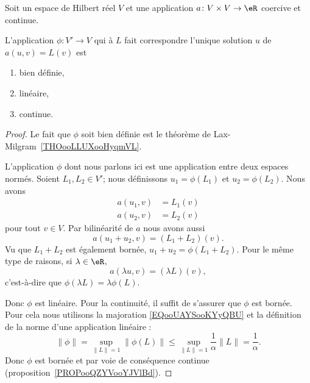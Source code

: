 \begin{proposition} \label{PROPooFEOZooTNPcBJ}
	Soit un espace de Hilbert réel \( V\) et une application \( a\colon V\times V\to \eR\) coercive et continue.

	L'application \( \phi\colon V'\to V\) qui à \( L\) fait correspondre l'unique solution \( u\) de \( a(u,v)=L(v)\) est
	\begin{enumerate}
		\item
		      bien définie,
		\item
		      linéaire,
		\item
		      continue.
	\end{enumerate}
\end{proposition}

\begin{proof}
	Le fait que \( \phi\) soit bien définie est le théorème de Lax-Milgram~\ref{THOooLLUXooHyqmVL}.

	L'application \( \phi\) dont nous parlons ici est une application entre deux espaces normés. Soient \( L_1,L_2\in V'\); nous définissons \( u_1=\phi(L_1)\) et \( u_2=\phi(L_2)\). Nous avons
	\begin{subequations}
		\begin{align}
			a(u_1,v) & =L_1(v) \\
			a(u_2,v) & =L_2(v)
		\end{align}
	\end{subequations}
	pour tout $v\in V$. Par bilinéarité de \( a\) nous avons aussi
	\begin{equation}
		a(u_1+u_2,v)=(L_1+L_2)(v).
	\end{equation}
	Vu que \( L_1+L_2\) est également bornée, \( u_1+u_2=\phi(L_1+L_2)\). Pour le même type de raisons, si \( \lambda\in \eR\),
	\begin{equation}
		a(\lambda u,v)=(\lambda L)(v),
	\end{equation}
	c'est-à-dire que \( \phi(\lambda L)=\lambda \phi(L)\).

	Donc \( \phi\) est linéaire. Pour la continuité, il suffit de s'assurer que \( \phi\) est bornée. Pour cela nous utilisons la majoration \eqref{EQooUAYSooKYyQBU} et la définition de la norme d'une application linéaire :
	\begin{equation}
		\| \phi \|=\sup_{\| L \|=1}\| \phi(L) \|\leq \sup_{\| L \|=1}\frac{1}{ \alpha }\| L \|=\frac{1}{ \alpha }.
	\end{equation}
	Donc \( \phi\) est bornée et par voie de conséquence continue (proposition~\ref{PROPooQZYVooYJVlBd}).
\end{proof}

